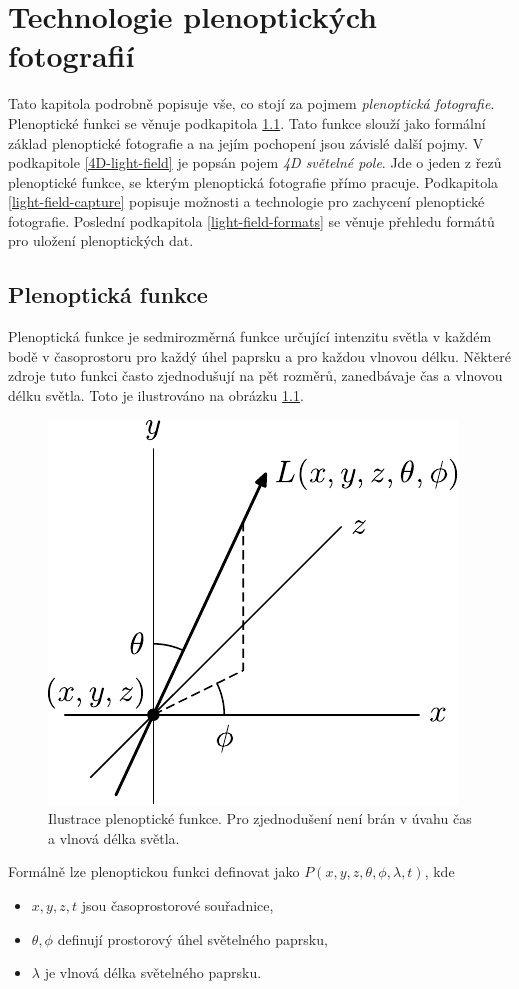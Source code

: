 \chapter{Technologie plenoptických fotografií}
\label{pleno-teo}
Tato kapitola podrobně popisuje vše, co stojí za pojmem \textit{plenoptická fotografie}.
Plenoptické funkci se věnuje podkapitola \ref{pleno-fce}.
Tato funkce slouží jako formální základ plenoptické fotografie a na jejím pochopení jsou závislé další pojmy.
V podkapitole \ref{4D-light-field} je popsán pojem \textit{4D světelné pole}.
Jde o jeden z řezů plenoptické funkce, se kterým plenoptická fotografie přímo pracuje.
Podkapitola \ref{light-field-capture} popisuje možnosti a technologie pro zachycení plenoptické fotografie.
Poslední podkapitola \ref{light-field-formats} se věnuje přehledu formátů pro uložení plenoptických dat.

\section{Plenoptická funkce}
\label{pleno-fce}
Plenoptická funkce je sedmirozměrná funkce určující intenzitu světla v každém bodě v časoprostoru pro každý úhel paprsku a pro každou vlnovou délku.
Některé zdroje tuto funkci často zjednodušují na pět rozměrů, zanedbávaje čas a vlnovou délku světla.
Toto je ilustrováno na obrázku \ref{plenoptic-function}.

\begin{figure}[h]
  \centering
  \includegraphics[width=.4\textwidth]{obrazky-figures/plenoptic-function.pdf}
	\caption{Ilustrace plenoptické funkce. Pro zjednodušení není brán v úvahu čas a vlnová délka světla.}
	\label{plenoptic-function}
\end{figure}

Formálně lze plenoptickou funkci definovat jako $P(x, y, z, \theta, \phi, \lambda, t)$, kde
\begin{itemize}
  \item $x, y, z, t$ jsou časoprostorové souřadnice,
  \item $\theta, \phi$ definují prostorový úhel světelného paprsku,
  \item $\lambda$ je vlnová délka světelného paprsku.
\end{itemize}


